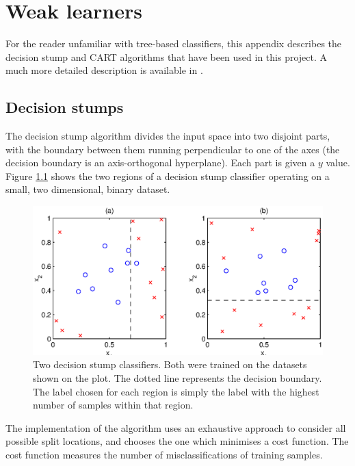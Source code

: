 \chapter{Weak learners}
\label{chapter:weak learners}

For the reader unfamiliar with tree-based classifiers, this appendix
describes the decision stump and CART algorithms that have been used
in this project.  A much more detailed description is available in
\cite{Cherkassky98}.


\section{Decision stumps}

The decision stump algorithm divides the input space
into two disjoint parts, with the boundary between them running
perpendicular to one of the axes (the decision boundary is an
axis-orthogonal hyperplane).  Each part is given a $y$ value.
Figure \ref{fig:decision stump} shows the two regions of a decision
stump classifier operating on a small, two dimensional, binary
dataset.

\begin{figure}
\begin{center}
\includegraphics{figures/stumpdiagram.eps}
\end{center}
\caption{Two decision stump classifiers.  Both were trained on the
datasets shown on the plot.  The dotted line represents the decision
boundary.  The label chosen for each region is
simply the label with the highest number of samples within that region.}
\label{fig:decision stump}
\end{figure}

The implementation of the algorithm uses an exhaustive approach to
consider all possible split locations, and chooses the one which
minimises a cost function.  The cost function measures the number of
misclassifications of training samples.


